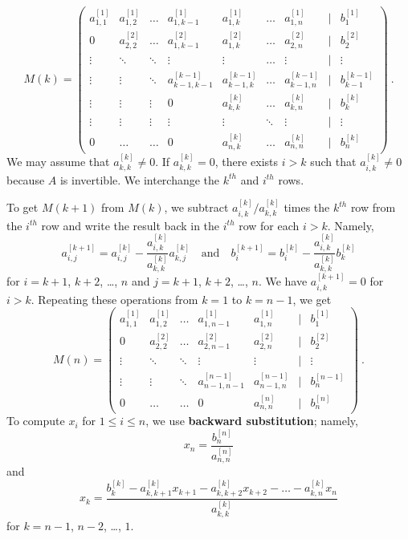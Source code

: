 \[
M(k) = \begin{pmatrix}
a^{[1]}_{1,1} & a^{[1]}_{1,2} & \dots & a^{[1]}_{1,k-1} & a^{[1]}_{1,k} & \ldots &
a^{[1]}_{1,n} & | & b^{[1]}_1 \\
0 & a^{[2]}_{2,2} & \ldots  & a^{[2]}_{1,k-1} & a^{[2]}_{1,k} &
\ldots & a^{[2]}_{2,n} & | & b^{[2]}_2\\
\vdots & \ddots & \ddots & \vdots & \vdots & \ldots & \vdots & | & \vdots \\
\vdots & \vdots & \ddots & a^{[k-1]}_{k-1,k-1} & a^{[k-1]}_{k-1,k} & \ldots &
a^{[k-1]}_{k-1,n} & | & b^{[k-1]}_{k-1}\\
\vdots & \vdots & \vdots & 0 & a^{[k]}_{k,k} & \ldots & a^{[k]}_{k,n}
& | & b^{[k]}_k\\
\vdots & \vdots & \vdots & \vdots & \vdots & \ddots & \vdots & | & \vdots \\
0 & \ldots & \ldots & 0 & a^{[k]}_{n,k} & \ldots & a^{[k]}_{n,n} & | & b^{[k]}_n
\end{pmatrix}  \ .
\]
We may assume that $a^{[k]}_{k,k}\not=0$.  If $a^{[k]}_{k,k} = 0$, there
exists $i>k$ such that $a^{[k]}_{i,k}\not=0$ because $A$ is invertible.
We interchange the $k^{th}$ and $i^{th}$ rows.

To get $M(k+1)$ from $M(k)$, we subtract
$a^{[k]}_{i,k}/a^{[k]}_{k,k}$ times the $k^{th}$ row from the $i^{th}$ row
and write the result back in the $i^{th}$ row for each $i > k$.  Namely,
\begin{equation} \label{iminusk}
a^{[k+1]}_{i,j} = a^{[k]}_{i,j} - \frac{a^{[k]}_{i,k}}{a^{[k]}_{k,k}} a^{[k]}_{k,j}
\quad \text{and} \quad
b^{[k+1]}_i = b^{[k]}_i - \frac{a^{[k]}_{i,k}}{a^{[k]}_{k,k}} b^{[k]}_k
\end{equation}
for $i=k+1$, $k+2$, \ldots, $n$ and $j=k+1$, $k+2$, \ldots, $n$.
We have $a^{[k+1]}_{i,k} = 0$ for $i>k$.  Repeating these operations
from $k=1$ to $k=n-1$, we get
\[
M(n) = \begin{pmatrix}
a^{[1]}_{1,1} & a^{[1]}_{1,2} & \dots & a^{[1]}_{1,n-1} &
a^{[1]}_{1,n} & | & b^{[1]}_1 \\
0 & a^{[2]}_{2,2} & \ldots & a^{[2]}_{2,n-1} & a^{[2]}_{2,n} & | & b^{[2]}_2\\
\vdots & \ddots & \ddots & \vdots & \vdots & | & \vdots \\
\vdots & \vdots & \ddots & a^{[n-1]}_{n-1,n-1} & a^{[n-1]}_{n-1,n} & |
& b^{[n-1]}_n \\
0 & \ldots & \ldots & 0 & a^{[n]}_{n,n} & | & b^{[n]}_n
\end{pmatrix}  \ .
\]
To compute $x_i$ for $1\leq i \leq n$, we use
{\bfseries backward substitution}; namely,
\[
x_n = \frac{b^{[n]}_n}{a^{[n]}_{n,n}}
\]
and
\begin{equation} \label{backsubst}
x_{k} = \frac{b^{[k]}_k - a^{[k]}_{k,k+1} x_{k+1} - a^{[k]}_{k,k+2}
  x_{k+2} - \ldots  - a^{[k]}_{k,n} x_n}{a^{[k]}_{k,k}}
\end{equation}
for $k=n-1$, $n-2$, \ldots, $1$.

